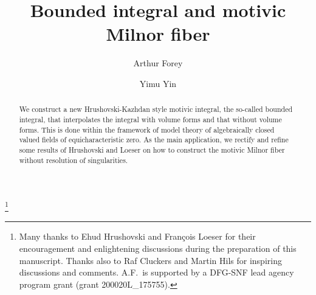 \documentclass[12pt]{amsart}
\theoremstyle{plain}
\theoremstyle{definition}
\theoremstyle{remark}
\numberwithin{equation}{section}
\theoremstyle{plain}
\newcommand{\0}{\emptyset}
\begin{document}
\title[Bounded integral and motivic Milnor fiber]{Bounded integral and motivic Milnor fiber}

\author[Arthur Forey]{Arthur Forey}
\address[A. Forey]{D-MATH, ETH Z\"urich, R\"amistrasse 101, CH-8092 Z\"urich, Switzerland}

\author[Yimu Yin]{Yimu Yin}
\address[Y. Yin]{Pasadena, California}

\thanks{Many thanks to Ehud Hrushovski and Fran\c cois Loeser for their encouragement and enlightening discussions during the preparation of this manuscript. Thanks also to Raf Cluckers and Martin Hils for inspiring discussions and comments. A.F.\ is supported by a DFG-SNF lead agency program grant
  (grant 200020L\_175755). }




\begin{abstract}
We construct a new Hrushovski-Kazhdan style motivic integral, the so-called bounded integral, that interpolates the integral with volume forms and that without volume forms. This is done within the framework of model theory of algebraically closed valued fields of equicharacteristic zero. As the main application, we rectify and refine some results of Hrushovski and Loeser on how to construct the motivic Milnor fiber without resolution of singularities.
\end{abstract}



\maketitle
\end{document}
